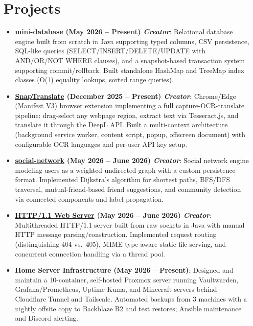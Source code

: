 \documentclass[letterpaper,11pt]{article}
\newcommand{\resumeItem}[2]{
	\item\small{
		\textbf{#1}{: #2}
	}
}
\newcommand{\resumeSubItem}[2]{\resumeItem{#1}{#2}}
\newcommand{\resumeSubHeadingListStart}{\begin{itemize}[leftmargin=*, itemsep=4pt, topsep=2pt, parsep=0pt]}
\newcommand{\resumeSubHeadingListEnd}{\end{itemize}}
\begin{document}
\section{Projects}
\resumeSubHeadingListStart
\resumeSubItem{\href{https://github.com/LukasAnell/mini-database}{mini-database} (May 2026 -- Present) \textit{Creator}}
{Relational database engine built from scratch in Java supporting typed columns, CSV persistence, SQL-like queries (SELECT/INSERT/DELETE/UPDATE with AND/OR/NOT WHERE clauses), and a snapshot-based transaction system supporting commit/rollback. Built standalone HashMap and TreeMap index classes (O(1) equality lookups, sorted range queries).}

\resumeSubItem{\href{https://github.com/LukasAnell/SnapTranslate}{SnapTranslate} (December 2025 -- Present) \textit{Creator}}
{Chrome/Edge (Manifest V3) browser extension implementing a full capture-OCR-translate pipeline: drag-select any webpage region, extract text via Tesseract.js, and translate it through the DeepL API. Built a multi-context architecture (background service worker, content script, popup, offscreen document) with configurable OCR languages and per-user API key setup.}

\resumeSubItem{\href{https://github.com/LukasAnell/social-network}{social-network} (May 2026 -- June 2026) \textit{Creator}}
{Social network engine modeling users as a weighted undirected graph with a custom persistence format. Implemented Dijkstra's algorithm for shortest paths, BFS/DFS traversal, mutual-friend-based friend suggestions, and community detection via connected components and label propagation.}

\resumeSubItem{\href{https://github.com/LukasAnell/java-http-server}{HTTP/1.1 Web Server} (May 2026 -- June 2026) \textit{Creator}}
{Multithreaded HTTP/1.1 server built from raw sockets in Java with manual HTTP message parsing/construction. Implemented request routing (distinguishing 404 vs.\ 405), MIME-type-aware static file serving, and concurrent connection handling via a thread pool.}

\resumeSubItem{Home Server Infrastructure (May 2026 -- Present)}
{Designed and maintain a 10-container, self-hosted Proxmox server running Vaultwarden, Grafana/Prometheus, Uptime Kuma, and Minecraft servers behind Cloudflare Tunnel and Tailscale. Automated backups from 3 machines with a nightly offsite copy to Backblaze B2 and test restores; Ansible maintenance and Discord alerting.}
\resumeSubHeadingListEnd
\end{document}
